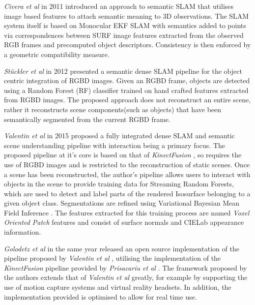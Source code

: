 {%

\label{sec:lit_review_semantic}
\textit{Civera et al} \cite{Civera2011} in 2011 introduced an approach to semantic SLAM 
that utilises image based features to attach semantic meaning to 3D observations. The SLAM 
system itself is based on Monocular EKF SLAM \cite{Smith1990} with semantics added to points via 
correspondences between SURF\cite{Bay2006} image features extracted from the observed RGB frames and 
precomputed object descriptors. Consistency is then enforced by a geometric compatibility 
measure.

\textit{St{\"u}ckler et al} \cite{Stuckler2012} in 2012 presented a semantic dense SLAM 
pipeline for the object centric integration of RGBD images. Given an RGBD frame, objects 
are detected using a Random Forest (RF) \cite{Ho1995} classifier trained on hand crafted features 
extracted from RGBD images. The proposed approach does not reconstruct an entire scene, rather it 
reconstructs scene components(such as objects) that have been semantically segmented 
from the current RGBD frame.

\textit{Valentin et al} \cite{Valentin2015} in 2015 proposed a fully integrated dense SLAM 
and semantic scene understanding pipeline with interaction being a primary focus. The 
proposed pipeline at it's core is based on that of \textit{KinectFusion} \cite{Newcombe2011}, 
so requires the use of RGBD images and is restricted to the reconstruction of static scenes. 
Once a scene has been reconstructed, the author's pipeline allows users to interact with 
objects in the scene to provide training data for Streaming Random Forests\cite{Abdulsalam2007}, 
which are used to detect and label parts of the rendered Isosurface belonging to a given 
object class. Segmentations are refined using Variational Bayesian Mean Field Inference 
\cite{Xing2002, Krahenbuhl2011}. The features extracted for this training 
process are named \textit{Voxel Oriented Patch} features and consist of surface normals 
and CIELab appearance information.

\textit{Golodetz et al} \cite{Golodetz2015} in the same year released an open source 
implementation of the pipeline proposed by \textit{Valentin et al} \cite{Valentin2015}, 
utilising the implementation of the \textit{KinectFusion} \cite{Newcombe2011} pipeline 
provided by \textit{Prisacariu et al} \cite{Prisacariu2014}. The framework proposed by 
the authors extends that of \textit{Valentin et al} \cite{Valentin2015} greatly, for 
example by supporting the use of motion capture systems and virtual reality headsets. 
In addition, the implementation provided is optimised to allow for real time use.

}
